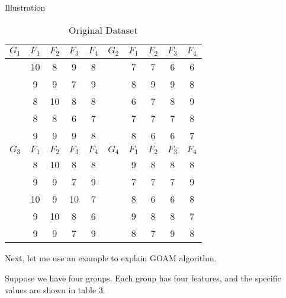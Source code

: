 \documentclass[
size=14pt,
paper=smartboard,  %
mode=present, 		%
display=slides, 	%
style=tuliplab,  	%
pauseslide,
fleqn,leqno]{powerdot}
\begin{document}
\begin{slide}[toc=,bm=]{Illustration}
	\begin{table}
		\setlength{\abovecaptionskip}{0pt}
		\setlength{\belowcaptionskip}{10pt}
		\centering
		\caption{Original Dataset}
		\begin{tabular}{ccccc | ccccc}
			\toprule
			$G_1$ & $F_1$ & $F_2$ & $F_3$ & $F_4$ & $G_2$ & $F_1$ & $F_2$ & $F_3$ & $F_4$ \\
			\midrule
			&10 & 8 & 9 & 8 & &7 & 7 & 6 & 6 \\
			&9  & 9 & 7 & 9 & &8 & 9 & 9 & 8 \\
			&8  & 10& 8 & 8 & &6 & 7 & 8 & 9  \\
			&8  & 8 & 6 & 7 & &7 & 7 & 7 & 8  \\
			&9  & 9 & 9 & 8 & &8 & 6 & 6 & 7  \\
			\midrule
			$G_3$ & $F_1$ & $F_2$ & $F_3$ & $F_4$ & $G_4$ & $F_1$ & $F_2$ & $F_3$ & $F_4$ \\
			\midrule
			&8 & 10 & 8 & 8 & &9 & 8 & 8 & 8\\
			&9 & 9  & 7 & 9 & &7 & 7 & 7 & 9\\
			&10& 9  & 10& 7 & &8 & 6 & 6 & 8\\
			&9 & 10 & 8 & 6 & &9 & 8 & 8 & 7\\
			&9 & 9  & 7 & 9 & &8 & 7 & 9 & 8\\
			\bottomrule
		\end{tabular}
	\end{table}
	
	\begin{note}
		Next,
		let me use an example to explain GOAM algorithm.
		
		Suppose we have four groups.
		Each group has four features,
		and
		the specific values are shown in table $3$.
	\end{note}
	
\end{slide}
\end{document}
